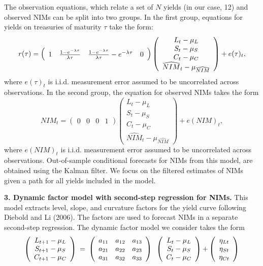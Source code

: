 \documentclass[11pt]{article}
\begin{document}
The observation equations, which relate a set of $N$ yields (in our case, 12) and observed NIMs can be split into two groups. In the first group, equations for yields on treasuries of maturity $\tau $ take the form:
\[
r(\tau )=\left(
\begin{array}{cccc}
1 & \frac{1-e^{-\lambda \tau }}{\lambda \tau } & \frac{1-e^{-\lambda \tau }}{%
\lambda \tau }-e^{-\lambda \tau } & 0%
\end{array}%
\right) \left(
\begin{array}{c}
{L_{t}-\mu _{L}} \\
{S_{t}-\mu _{S}} \\
{C_{t}-\mu _{C}} \\
\widehat{NIM}_{t}-\mu _{\widehat{NIM}}%
\end{array}%
\right) +e(\tau )_{t},
\]%
where $e(\tau )_{t}$ is i.i.d. measurement error assumed to be uncorrelated
across observations. \bigskip In the second group, the equation for observed
NIMs takes the form%
\[
NIM_{t}=\left(
\begin{array}{cccc}
0 & 0 & 0 & 1%
\end{array}%
\right) \left(
\begin{array}{c}
{L_{t}-\mu _{L}} \\
{S_{t}-\mu _{S}} \\
{C_{t}-\mu _{C}} \\
\widehat{NIM}_{t}-\mu _{\widehat{NIM}}%
\end{array}%
\right) +e(NIM)_{t},
\]
where $e(NIM)_{t}$ is i.i.d. measurement error assumed to be uncorrelated across observations. Out-of-sample conditional forecasts for NIMs from this model, are obtained using the Kalman filter. We focus on the filtered estimates of NIMs given a path for all yields included in the model.

\noindent \textbf{3. Dynamic factor model with second-step regression for NIMs.} This model extracts level, slope, and curvature factors for the yield curve following Diebold and Li (2006). The factors are used to forecast NIMs in a separate second-step regression. The dynamic factor model we consider takes the form
\[
\left(
\begin{array}{c}
{L_{t+1}-\mu _{L}} \\
{S_{t+1}-\mu _{S}} \\
{C_{t+1}-\mu _{C}}%
\end{array}%
\right) {\normalsize \ =\ }\left(
\begin{array}{ccc}
a_{11} & a_{12} & a_{13} \\
a_{21} & a_{22} & a_{23} \\
a_{31} & a_{32} & a_{33}%
\end{array}%
\right) {\normalsize \ }\left(
\begin{array}{c}
{L_{t}-\mu _{L}} \\
{S_{t}-\mu _{S}} \\
{C_{t}-\mu _{C}}%
\end{array}%
\right) {\normalsize +}\left(
\begin{array}{c}
{\eta _{Lt}} \\
{\eta _{St}} \\
{\eta _{Ct}}%
\end{array}%
\right)
\]
\end{document}
